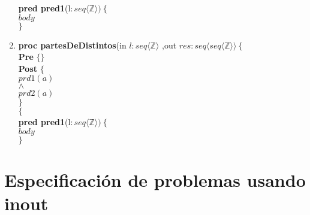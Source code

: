 \documentclass[a4paper]{article}
\begin{document}
\begin{enumerate}[label=\alph*)]
			\textbf{pred pred1}(l$: seq\langle \mathbb{Z}\rangle)\ \{$\smallskip \\
			\hspace*{6mm}$body$\\
			$\}$		
			
		\item
		
			\textbf{proc partesDeDistintos}(in $l: seq \langle \mathbb{Z}\rangle$
				,out $res:seq\langle seq\langle \mathbb{Z}\rangle \rangle \ \{$\smallskip \\
			\hspace*{6mm} \textbf{Pre }$\{ \}$\smallskip \\
			\hspace*{6mm} \textbf{Post }$\{$\\
			\hspace*{6mm} $prd1(a)$\\
			\hspace*{6mm} $\wedge$\\
			\hspace*{6mm} $prd2(a)$\\
			\hspace*{6mm} $\}$\\
			$\{$\smallskip \\
			
			\textbf{pred pred1}(l$: seq\langle \mathbb{Z}\rangle)\ \{$\smallskip \\
			\hspace*{6mm}$body$\\
			$\}$	
	\end{enumerate}
	
\section*{Especificación de problemas usando \textbf{inout}}
\end{document}
